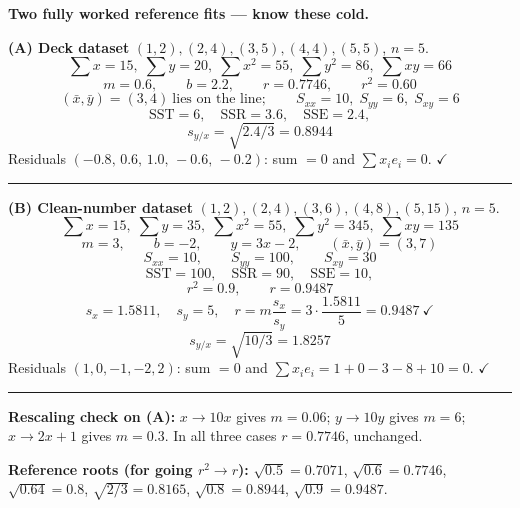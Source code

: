\begin{numbox}
\textbf{Two fully worked reference fits --- know these cold.}

\smallskip
\textbf{(A) Deck dataset} $(1,2),(2,4),(3,5),(4,4),(5,5)$, $n=5$.
\[
  \textstyle\sum x=15,\; \sum y=20,\; \sum x^2=55,\; \sum y^2=86,\; \sum xy=66
\]
\[
  m=0.6,\qquad b=2.2,\qquad r=0.7746,\qquad r^2=0.60
\]
\[
  (\bar x,\bar y)=(3,4)\ \text{lies on the line};\qquad
  S_{xx}=10,\; S_{yy}=6,\; S_{xy}=6
\]
\[
  \mathrm{SST}=6,\quad \mathrm{SSR}=3.6,\quad \mathrm{SSE}=2.4,
\]
\[
  s_{y/x}=\sqrt{2.4/3}=0.8944
\]
Residuals $(-0.8,\,0.6,\,1.0,\,-0.6,\,-0.2)$: sum $=0$ and $\sum x_ie_i=0$. $\checkmark$

\smallskip\hrule\smallskip
\textbf{(B) Clean-number dataset} $(1,2),(2,4),(3,6),(4,8),(5,15)$, $n=5$.
\[
  \textstyle\sum x=15,\; \sum y=35,\; \sum x^2=55,\; \sum y^2=345,\; \sum xy=135
\]
\[
  m=3,\qquad b=-2,\qquad \hat y=3x-2,\qquad (\bar x,\bar y)=(3,7)
\]
\[
  S_{xx}=10,\qquad S_{yy}=100,\qquad S_{xy}=30
\]
\[
  \mathrm{SST}=100,\quad \mathrm{SSR}=90,\quad \mathrm{SSE}=10,
\]
\[
  r^2=0.9,\qquad r=0.9487
\]
\[
  s_x=1.5811,\quad s_y=5,\quad r=m\frac{s_x}{s_y}=3\cdot\frac{1.5811}{5}=0.9487\ \checkmark
\]
\[
  s_{y/x}=\sqrt{10/3}=1.8257
\]
Residuals $(1,0,-1,-2,2)$: sum $=0$ and $\sum x_ie_i=1+0-3-8+10=0$. $\checkmark$

\smallskip\hrule\smallskip
\textbf{Rescaling check on (A):} $x\to10x$ gives $m=0.06$; $y\to10y$ gives $m=6$;
$x\to2x+1$ gives $m=0.3$. In all three cases $r=0.7746$, unchanged.

\smallskip
\textbf{Reference roots (for going $r^2\to r$):}
$\sqrt{0.5}=0.7071$, $\sqrt{0.6}=0.7746$, $\sqrt{0.64}=0.8$,
$\sqrt{2/3}=0.8165$, $\sqrt{0.8}=0.8944$, $\sqrt{0.9}=0.9487$.
\end{numbox}

